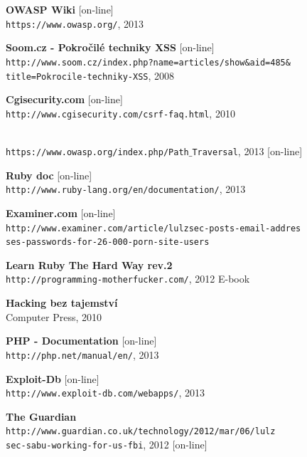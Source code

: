 \documentclass[12pt, a4paper]{report}
\begin{document}
\begin{thebibliography}{9}
	{\bf OWASP Wiki} [on-line] \\
	\texttt{https://www.owasp.org/}, 2013

	{\bf Soom.cz - Pokročilé techniky XSS} [on-line]\\
	\texttt{http://www.soom.cz/index.php?name=articles/show\&aid=485\&\\title=Pokrocile-techniky-XSS}, 2008

	{\bf Cgisecurity.com} [on-line]\\
	\texttt{http://www.cgisecurity.com/csrf-faq.html}, 2010

\\
	\texttt{https://www.owasp.org/index.php/Path$\_$Traversal}, 2013 [on-line]

	{\bf Ruby doc} [on-line]\\
	\texttt{http://www.ruby-lang.org/en/documentation/}, 2013

	{\bf Examiner.com} [on-line]\\
	\texttt{http://www.examiner.com/article/lulzsec-posts-email-addres\\ses-passwords-for-26-000-porn-site-users}

 {\bf Learn Ruby The Hard Way rev.2}\\
	\texttt{http://programming-motherfucker.com/}, 2012 E-book

               {\bf Hacking bez tajemství} \\
           	Computer Press, 2010

	{\bf PHP - Documentation} [on-line]\\
	\texttt{http://php.net/manual/en/}, 2013

	{\bf Exploit-Db} [on-line]\\
	\texttt{http://www.exploit-db.com/webapps/}, 2013

 {\bf The Guardian}\\
	\texttt{http://www.guardian.co.uk/technology/2012/mar/06/lulz\\sec-sabu-working-for-us-fbi}, 2012 [on-line]


\end{thebibliography}
\end{document}
